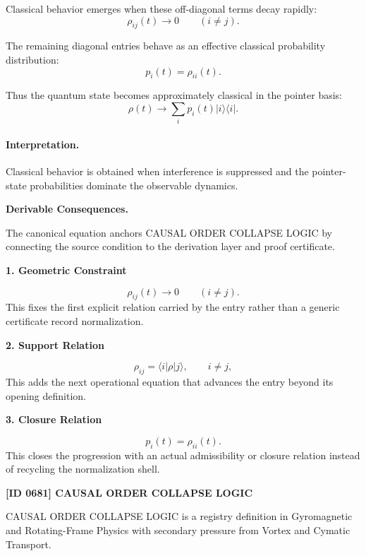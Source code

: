 Classical behavior emerges when these off-diagonal terms decay rapidly:
\begin{equation}
\rho_{ij}(t)\rightarrow 0
\qquad
(i\neq j).
\end{equation}

The remaining diagonal entries behave as an effective classical probability distribution:
\begin{equation}
p_i(t)=\rho_{ii}(t).
\end{equation}

Thus the quantum state becomes approximately classical in the pointer basis:
\begin{equation}
\boxed{
\rho(t)
\longrightarrow
\sum_i p_i(t)|i\rangle\langle i|.
}
\end{equation}

\paragraph{Interpretation.}
Classical behavior is obtained when interference is suppressed and the pointer-state probabilities dominate the observable dynamics.

\par\vspace{0.35em}
\noindent\textbf{Derivable Consequences.}\quad
\begingroup
\footnotesize
\raggedright
The canonical equation anchors CAUSAL ORDER COLLAPSE LOGIC by connecting the source condition to the derivation layer and proof certificate.
\par\endgroup

\noindent\textbf{1. Geometric Constraint}\par
\[
\rho_{ij}(t)\rightarrow 0 \qquad (i\neq j).
\]
\noindent This fixes the first explicit relation carried by the entry rather than a generic certificate record normalization.\par
\noindent\textbf{2. Support Relation}\par
\[
\rho_{ij} = \langle i|\rho|j\rangle, \qquad i\neq j,
\]
\noindent This adds the next operational equation that advances the entry beyond its opening definition.\par
\noindent\textbf{3. Closure Relation}\par
\[
p_i(t)=\rho_{ii}(t).
\]
\noindent This closes the progression with an actual admissibility or closure relation instead of recycling the normalization shell.\par

\clearpage
\noindent\textbf{[ID 0681] CAUSAL ORDER COLLAPSE LOGIC}\par
\vspace{0.35em}
\begingroup\small
{}
CAUSAL ORDER COLLAPSE LOGIC is a registry definition in Gyromagnetic and Rotating-Frame Physics with secondary pressure from Vortex and Cymatic Transport.

